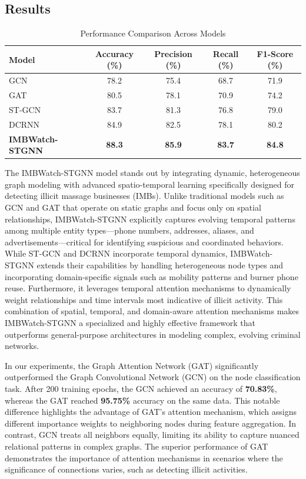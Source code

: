 \documentclass[letterpaper]{article} %
\begin{document}
\subsection{Results}

\begin{table}[ht]
\centering
\caption{Performance Comparison Across Models}
\label{tab:model_performance}
\renewcommand{\arraystretch}{1.1} %
\begin{tabular}{lcccc}
\hline
\textbf{Model} & \textbf{Accuracy (\%)} & \textbf{Precision (\%)} & \textbf{Recall (\%)} & \textbf{F1-Score (\%)} \\
\hline
GCN              & 78.2 & 75.4 & 68.7 & 71.9 \\
GAT              & 80.5 & 78.1 & 70.9 & 74.2 \\
ST-GCN           & 83.7 & 81.3 & 76.8 & 79.0 \\
DCRNN            & 84.9 & 82.5 & 78.1 & 80.2 \\
\textbf{IMBWatch-STGNN}   & \textbf{88.3} & \textbf{85.9} & \textbf{83.7} & \textbf{84.8} \\
\hline
\end{tabular}
\end{table}

The IMBWatch-STGNN model stands out by integrating dynamic, heterogeneous graph modeling with advanced spatio-temporal learning specifically designed for detecting illicit massage businesses (IMBs). Unlike traditional models such as GCN and GAT that operate on static graphs and focus only on spatial relationships, IMBWatch-STGNN explicitly captures evolving temporal patterns among multiple entity types---phone numbers, addresses, aliases, and advertisements---critical for identifying suspicious and coordinated behaviors. While ST-GCN and DCRNN incorporate temporal dynamics, IMBWatch-STGNN extends their capabilities by handling heterogeneous node types and incorporating domain-specific signals such as mobility patterns and burner phone reuse. Furthermore, it leverages temporal attention mechanisms to dynamically weight relationships and time intervals most indicative of illicit activity. This combination of spatial, temporal, and domain-aware attention mechanisms makes IMBWatch-STGNN a specialized and highly effective framework that outperforms general-purpose architectures in modeling complex, evolving criminal networks.

In our experiments, the Graph Attention Network (GAT) significantly outperformed the Graph Convolutional Network (GCN) on the node classification task. After 200 training epochs, the GCN achieved an accuracy of \textbf{70.83\%}, whereas the GAT reached \textbf{95.75\%} accuracy on the same data. This notable difference highlights the advantage of GAT’s attention mechanism, which assigns different importance weights to neighboring nodes during feature aggregation. In contrast, GCN treats all neighbors equally, limiting its ability to capture nuanced relational patterns in complex graphs. The superior performance of GAT demonstrates the importance of attention mechanisms in scenarios where the significance of connections varies, such as detecting illicit activities.\\
\end{document}
